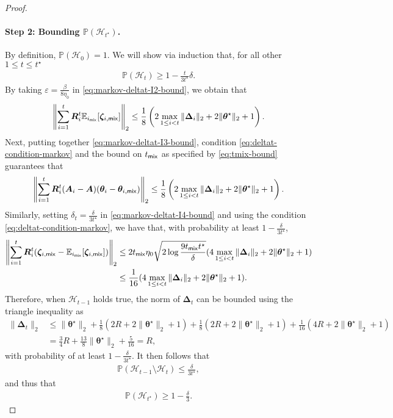 \begin{proof}
\paragraph{Step 2: Bounding $\mathbb{P}(\mathcal{H}_{t^\star})$.} By definition, $\mathbb{P}(\mathcal{H}_0) = 1$. We will show via induction that, for all other $1 \leq t \leq t^\star$
\begin{align*}
\mathbb{P}(\mathcal{H}_t) \geq 1-\frac{t}{3t^\star} \delta.%
\end{align*}
By taking $\varepsilon = \frac{\beta}{8\eta_0}$ in \eqref{eq:markov-deltat-I2-bound}, we obtain that
\begin{align*}
\left\| \sum_{i=1}^t \bm{R}_i^t \mathbb{E}_{i_{\mathsf{mix}}}[\bm{\zeta}_{i,\mathsf{mix}}] \right\|_2 \leq \frac{1}{8}\left(2\max_{1 \leq i < t} \|\bm{\Delta}_i\|_2 + 2\|\bm{\theta}^\star\|_2  + 1\right).
\end{align*}
Next, putting together \eqref{eq:markov-deltat-I3-bound}, condition \eqref{eq:deltat-condition-markov} and the bound on $t_{\mathsf{mix}}$ as specified by \eqref{eq:tmix-bound} guarantees that
\begin{align*}
\left\|\sum_{i=1}^t \bm{R}_i^t (\bm{A}_i - \bm{A}) (\bm{\theta}_i - \bm{\theta}_{i,\mathsf{mix}})\right\|_2 \leq \frac{1}{8}\left(2\max_{1 \leq i < t} \|\bm{\Delta}_i\|_2 + 2\|\bm{\theta}^\star\|_2  + 1\right).
\end{align*}
Similarly, setting $\delta_t = \frac{\delta}{3t^\star}$ in \eqref{eq:markov-deltat-I4-bound} and using the condition \eqref{eq:deltat-condition-markov}, we have that, with probability at least $1-\frac{\delta}{3t^\star}$, 
\begin{align*}
\left\|\sum_{i=1}^t \bm{R}_i^t (\bm{\zeta}_{i,\mathsf{mix}} - \mathbb{E}_{i_{\mathsf{mix}}}[\bm{\zeta}_{i,\mathsf{mix}}])\right\|_2 &\leq 2t_{\mathsf{mix}} \eta_0 \sqrt{2\log \frac{9t_{\mathsf{mix}} t^\star}{\delta}}(4\max_{1 \leq i < t} \|\bm{\Delta}_i\|_2 + 2\|\bm{\theta}^\star\|_2  + 1) \\ 
&\leq \frac{1}{16}(4\max_{1 \leq i < t} \|\bm{\Delta}_i\|_2 + 2\|\bm{\theta}^\star\|_2  + 1).
\end{align*}
Therefore, when $\mathcal{H}_{t-1}$ holds true, the norm of $\bm{\Delta}_t$ can be bounded using the triangle inequality as
\begin{align}\label{eq:markov-deltat-induction}
\|\bm{\Delta}_t\|_2 &\leq \|\bm{\theta}^\star\|_2 + \frac{1}{8}\left(2R + 2\|\bm{\theta}^\star\|_2  + 1\right) + \frac{1}{8}\left(2R + 2\|\bm{\theta}^\star\|_2  + 1\right) + \frac{1}{16}(4R + 2\|\bm{\theta}^\star\|_2  + 1) \nonumber \\ 
&= \frac{3}{4}R + \frac{13}{8}\|\bm{\theta}^\star\|_2 + \frac{5}{16} = R,
\end{align}
with probability of at least $1-\frac{\delta}{3t^\star}$. It then follows that
\begin{align*}
\mathbb{P}(\mathcal{H}_{t-1} \setminus \mathcal{H}_t) \leq \frac{\delta}{3t^\star},
\end{align*}
and thus that
\begin{align*}
\mathbb{P}(\mathcal{H}_{t^\star}) \geq 1-\frac{\delta}{3}.
\end{align*}

\end{proof}
